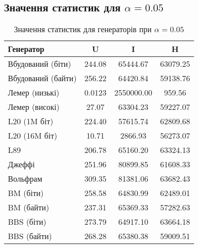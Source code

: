 \documentclass[12pt]{article}
\begin{document}
\subsection{Значення статистик для $\alpha = 0.05$}
\begin{table}[htbp]
\centering
\small
\begin{tabular}{l*{3}{c}}
\toprule
\textbf{Генератор} & \textbf{U} & \textbf{I} & \textbf{H} \\
\midrule
Вбудований (біти)  & 244.08 & 65444.67 & 63079.25 \\
Вбудований (байти) & 256.22 & 64420.84 & 59138.76 \\
Лемер (низькі)     & 0.0123 & 2550000.00 & 959.56 \\
Лемер (високі)     & 27.07 & 63304.23 & 59227.07 \\
L20 (1M біт)       & 224.40 & 57615.74 & 62809.68 \\
L20 (16M біт)      & 10.71 & 2866.93 & 56273.07 \\
L89                & 206.78 & 65160.20 & 63324.13 \\
Джеффі             & 251.96 & 80899.85 & 61608.33 \\
Вольфрам           & 309.35 & 81381.06 & 63682.43 \\
BM (біти)          & 258.58 & 64830.99 & 62489.01 \\
BM (байти)         & 237.31 & 65369.33 & 57282.63 \\
BBS (біти)         & 273.79 & 64917.10 & 63664.18 \\
BBS (байти)        & 268.28 & 65380.38 & 59009.51 \\
\bottomrule
\end{tabular}
\caption{Значення статистик для генераторів при $\alpha = 0.05$}
\label{tab:statistics_alpha_05}
\end{table}
\end{document}
